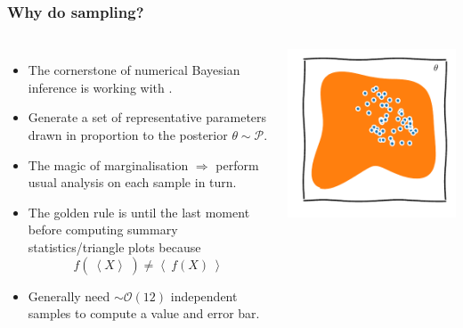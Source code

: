 \documentclass[aspectratio=169]{beamer}
\newcommand{\av}[2][]{\left\langle #2\right\rangle_{#1}}
\begin{document}
\begin{frame}
    \frametitle{Why do sampling?}
    \begin{columns}
        \begin{itemize}
            \item The cornerstone of numerical Bayesian inference is working with .
            \item Generate a set of representative parameters drawn in proportion to the posterior $\theta\sim\mathcal{P}$.
            \item The magic of marginalisation $\Rightarrow$ perform usual analysis on each sample in turn.
            \item The golden rule is  until the last moment before computing summary statistics/triangle plots because \[\boxed{f(\:\av{X}\:)\ne \av{\:f(X)\:}}\]
            \item Generally need $\sim\mathcal{O}(12)$ independent samples to compute a value and error bar.
        \end{itemize}
        \includegraphics{figures/samples.pdf}
    \end{columns}
\end{frame}
\end{document}
